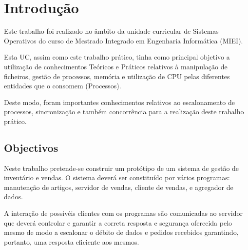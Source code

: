 \documentclass[a4paper,11pt]{report}
\begin{document}


\tableofcontents
\clearpage



\chapter{Introdução}

\hspace{0.50cm} Este trabalho foi realizado no âmbito da unidade curricular de Sistemas Operativos do curso de Mestrado Integrado em Engenharia Informática (MIEI). \par

\vspace{0.5cm}

Esta UC, assim como este trabalho prático, tinha como principal objetivo a utilização de conhecimentos Teóricos e 
Práticos relativos à manipulação de ficheiros, gestão de processos, memória e utilização de CPU pelas diferentes entidades que o consomem (Processos). 

\vspace{0.5cm}

Deste modo, foram importantes conhecimentos relativos ao escalonamento de processos, sincronização e também concorrência para a realização deste trabalho prático. \par

\section{Objectivos}

\hspace{0.50cm} Neste trabalho pretende-se construir um protótipo de um sistema de gestão de inventário e vendas. O
sistema deverá ser constituído por vários programas: manutenção de artigos, servidor de vendas, cliente
de vendas, e agregador de dados. \par 

\vspace{0.5cm}

A interação de possivéis clientes com os programas são comunicadas ao servidor que deverá controlar e garantir a correta resposta e segurança oferecida pelo mesmo de modo a escalonar o débito de dados e pedidos recebidos garantindo, portanto, uma resposta eficiente aos mesmos.
\end{document}

